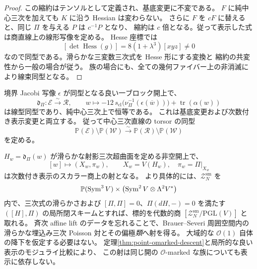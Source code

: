 \begin{proof}
この縮約はテンソルとして定義され、基底変更に不変である。
$F$ に純中心三次を加えても $K$ に沿う Hessian は変わらない。
さらに $F$ を $cF$ に替えると、同じ $\Pi$ を与える $P$ は $c^{-1}P$ となり、
縮約は $c$ 倍となる。従って表示した式は商直線上の線形写像を定める。
Hesse 座標では
\[
 [\det\operatorname{Hess}(g)]=8(1+\lambda^3)[xyz]\ne0
\]
なので同型である。滑らかな三変数三次式を Hesse 形にする変換と
縮約の共変性から一般の場合が従う。
族の場合にも、全ての幾何ファイバー上の非消滅により線束同型となる。
\end{proof}

\begin{theorem}
\label{thm:point-trace-hessian}
境界 Jacobi 写像 $\epsilon$ が同型となる良い一ブロック開上で、
\begin{equation}\label{eq:point-trace-hessian-map}
 \mathfrak d_\Pi:\mathcal E\xrightarrow{\sim}\mathcal R,
 \qquad
 w\longmapsto
 -12\,s_{\mathrm{cl}}\bigl(\nu_\Pi^{-1}(\epsilon(\overline w))\bigr)
 +\operatorname{tr}(\alpha(w))
\end{equation}
は線型同型であり、純中心三次上で恒等である。
これは基底変更および次数付き表示変更と両立する。
従って中心三次直線の torsor の同型
\begin{equation}\label{eq:point-central-classical-torsors}
 \mathbb P(\mathcal E)\setminus\mathbb P(\mathcal W)
 \xrightarrow{\sim}
 \mathbb P(\mathcal R)\setminus\mathbb P(\mathcal W)
\end{equation}
を定める。

$H_w=\mathfrak d_\Pi(w)$ が滑らかな射影三次超曲面を定める非空開上で、
\begin{equation}\label{eq:point-poisson-pair}
 [w]\longmapsto (X_w,\pi_w),\qquad
 X_w=V(H_w),\quad \pi_w=\Pi|_{X_w}
\end{equation}
は次数付き表示のスカラー商上の射となる。
より具体的には、$\mathcal Z_N^{\mathrm{sm}}$ を
\[
 \mathbb P(\operatorname{Sym}^3V)\times
 \bigl(\operatorname{Sym}^2V\otimes\Lambda^2V^*\bigr)
\]
内で、三次式の滑らかさおよび $[\Pi,\Pi]=0$、$\Pi(dH,-)=0$ を満たす
$([H],\Pi)$ の局所閉スキームとすれば、標的を代数的商
$[\mathcal Z_N^{\mathrm{sm}}/\mathrm{PGL}(V)]$ と取れる。
斉次 affine lift のデータを忘れることで、Brauer--Severi 周囲空間内の
滑らかな埋込み三次 Poisson 対とその偏極\emph{類}へ射を得る。
大域的な $\mathcal O(1)$ 自体の降下を仮定する必要はない。
定理\ref{thm:point-omarked-descent}と局所的な良い表示のモジュライ比較により、
この射は同じ開の $\mathcal O$-marked な族についても表示に依存しない。
\end{theorem}


